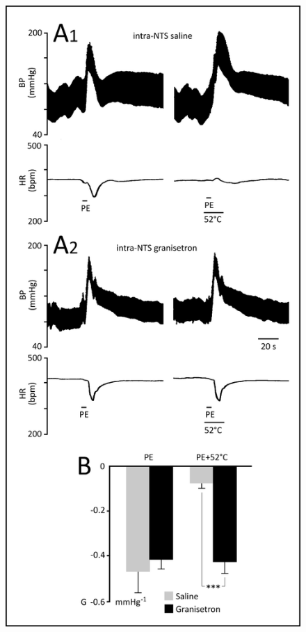 \documentclass[a4paper,12pt,twoside]{report}
\begin{document}
\begin{figure}[p]

\begin{center}
 \includegraphics[scale=1]{Article2-FIG7.jpg} 
\end{center}


\end{figure}
\end{document}
